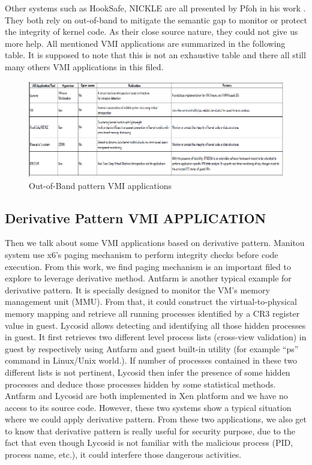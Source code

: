 Other systems such as HookSafe, NICKLE are all presented by Pfoh in his work  \cite{Reference7}. They both rely on out-of-band to mitigate the 
semantic gap to monitor or protect the integrity of kernel code. As their close source nature, they could not give us more help. All mentioned 
VMI applications are summarized in the following table. It is supposed to note that this is not an exhaustive table and there all still many 
others VMI applications in this filed.

\begin{figure}[htbp]
	\centering
		\includegraphics[scale=0.6]{Figures/Figure1.pdf}
	\caption[Out-of-Band pattern VMI applications]{Out-of-Band pattern VMI applications}
	\label{fig:Out-of-Band pattern VMI applications}
\end{figure}


\subsection{Derivative Pattern VMI APPLICATION}
Then we talk about some VMI applications based on derivative pattern. Manitou system use x6’s paging mechanism to perform integrity checks 
before code execution. From this work, we find paging mechanism is an important filed to explore to leverage derivative method. Antfarm is 
another typical example for derivative pattern. It is specially designed to monitor the VM’s memory management unit (MMU). From that, it could
construct the virtual-to-physical memory mapping and retrieve all running processes identified by a CR3 register value in guest. Lycosid allows
detecting and identifying all those hidden processes in guest. It first retrieves two different level process lists (cross-view validation) in 
guest by respectively using Antfarm and guest built-in utility (for example “ps” command in Linux/Unix world.). If number of processes contained
in these two different lists is not pertinent, Lycosid then infer the presence of some hidden processes and deduce those processes hidden by 
some statistical methods. Antfarm and Lycosid are both implemented in Xen platform and we have no access to its source code. However, these two
systems show a typical situation where we could apply derivative pattern. From these two applications, we also get to know that derivative 
pattern is really useful for security purpose, due to the fact that even though Lycosid is not familiar with the malicious process (PID, 
process name, etc.), it could interfere those dangerous activities.

